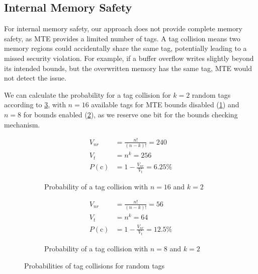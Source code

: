 \subsection{Internal Memory Safety}
\label{subsec:sec-guarantees-internal-memory-safety}

For internal memory safety, our approach does not provide complete memory safety, as \ac{MTE} provides a limited number of tags.
A tag collision means two memory regions could accidentally share the same tag, potentially leading to a missed security violation.
For example, if a buffer overflow writes slightly beyond its intended bounds, but the overwritten memory has the same tag, \ac{MTE} would not detect the issue.

We can calculate the probability for a tag collision for $k=2$ random tags according to \cref{fig:tag-collision}, with $n=16$ available tags for \ac{MTE} bounds disabled (\cref{fig:tag-collision-16}) and $n=8$ for bounds enabled (\cref{fig:tag-collision-8}), as we reserve one bit for the bounds checking mechanism.

\begin{figure}[h]
    \centering
    \begin{subfigure}[T]{0.45\textwidth}
        \centering
        \begin{align*}
            V_{nr} &= \frac{n!}{(n - k)!} = 240 \\
            V_t &= n^k = 256 \\
            P(\text{c}) &= 1 - \frac{V_{nr}}{V_t} = 6.25\%
        \end{align*}
        \caption{Probability of a tag collision with $n=16$ and $k=2$}
        \label{fig:tag-collision-16}
    \end{subfigure}
    \hfill
    \begin{subfigure}[T]{0.45\textwidth}
        \centering
        \begin{align*}
            V_{nr} &= \frac{n!}{(n - k)!} = 56 \\
            V_t &= n^k = 64 \\
            P(\text{c}) &= 1 - \frac{V_{nr}}{V_t} = 12.5\%
        \end{align*}
        \caption{Probability of a tag collision with $n=8$ and $k=2$}
        \label{fig:tag-collision-8}
    \end{subfigure}
    \caption{Probabilities of tag collisions for random tags}
    \label{fig:tag-collision}
\end{figure}


